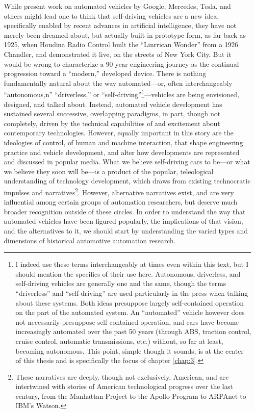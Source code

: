 While present work on automated vehicles by Google, Mercedes, Tesla,
and others might lead one to think that self-driving vehicles are a
new idea, specifically enabled by recent advances in artificial
intelligence, they have not merely been dreamed about, but actually
built in prototype form, as far back as 1925, when Houdina Radio Control
built the ``Linrrican Wonder'' from a 1926 Chandler, and demonstrated
it live, on the streets of New York City. But it would be wrong to
characterize a 90-year engineering journey as the continual
progression toward a ``modern,'' developed device. There is nothing
fundamentally natural about the way automated---or, often interchangeably
``autonomous,n'' ``driverless,'' or ``self-driving''\footnote{I indeed use these terms
  interchangeably at times even within this text, but I should mention
the specifics of their use here. Autonomous, driverless, and self-driving
vehicles are generally one and the same, though the terms
``driverless'' and
``self-driving'' are used particularly in the press when talking about
these systems. Both ideas presuppose largely self-contained operation
on the part of the automated system. An ``automated'' vehicle however
does not necessarily presuppose self-contained operation, and cars
have become increasingly automated over the past 50 years (through
ABS, traction control, cruise control, automatic transmissions, etc.) without, so
far at least, becoming autonomous. This point, simple though it
sounds, is at the center of this thesis and is specifically the focus
of chapter \ref{chap:3}.}---vehicles are being
envisioned, designed, and talked about. Instead, automated vehicle
development has sustained several successive, overlapping paradigms,
in part, though not completely, driven by the technical capabilities
of and excitement about contemporary technologies. However, equally
important in this story are the ideologies of control, of human and
machine interaction, that shape engineering practice and vehicle
development, and alter how developments are represented and discussed
in popular media. What we believe self-driving cars to be---or what we
believe they soon will be---is a product of the popular, teleological understanding
of technology development, which draws from existing technocratic
impulses and narratives\footnote{These narratives are deeply, though
  not exclusively, American, and are intertwined with stories of
  American technological progress over the last century, from the
  Manhattan Project to the Apollo Program to ARPAnet to IBM's
  Watson.}. However, alternative narratives exist, and 
are very influential among certain groups of automation researchers,
but deserve much broader recognition outside of these circles. In
order to understand the way that automated vehicles have been figured
popularly, the implications of that vision, and the alternatives to
it, we should start by understanding the varied types and dimensions
of historical automotive automation research.

